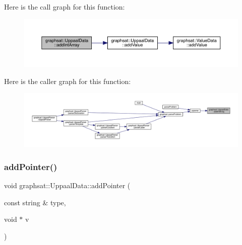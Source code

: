 Here is the call graph for this function\+:\nopagebreak
\begin{figure}[H]
\begin{center}
\leavevmode
\includegraphics[width=350pt]{classgraphsat_1_1_uppaal_data_a7efc419d4d89f6f54f1b37e6a0ac76da_cgraph}
\end{center}
\end{figure}
Here is the caller graph for this function\+:\nopagebreak
\begin{figure}[H]
\begin{center}
\leavevmode
\includegraphics[width=350pt]{classgraphsat_1_1_uppaal_data_a7efc419d4d89f6f54f1b37e6a0ac76da_icgraph}
\end{center}
\end{figure}
\mbox{\label{classgraphsat_1_1_uppaal_data_a8da77b23b7dc06303c819748398a2e27}} 
\subsubsection{\texorpdfstring{addPointer()}{addPointer()}}
{\footnotesize\ttfamily void graphsat\+::\+Uppaal\+Data\+::add\+Pointer (\begin{DoxyParamCaption}\item[{const string \&}]{type,  }\item[{void $\ast$}]{v }\end{DoxyParamCaption})\hspace{0.3cm}{\ttfamily [inline]}}

